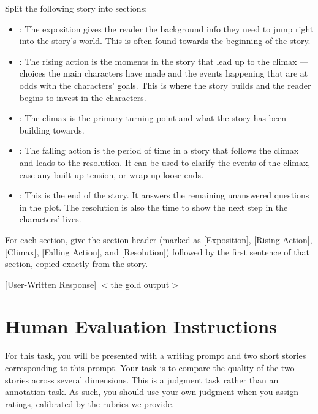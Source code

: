 \documentclass{article}
\begin{document}
\begin{tcolorbox}[colback=white, colframe=my-red, coltitle=black, parskip=5mm, title=
\textbf{\textsc{[Writing]} Synthetic Data Generation}, breakable, halign=flush left]
Split the following story into sections:
\begin{itemize}
\item[{$\star$}] [Exposition]: The exposition gives the reader the background info they need to jump right into the story's world. This is often found towards the beginning of the story.

\item[{$\star$}] [Rising Action]: The rising action is the moments in the story that lead up to the climax — choices the main characters have made and the events happening that are at odds with the characters' goals. This is where the story builds and the reader begins to invest in the characters.

\item[{$\star$}] [Climax]: The climax is the primary turning point and what the story has been building towards.

\item[{$\star$}] [Falling Action]: The falling action is the period of time in a story that follows the climax and leads to the resolution. It can be used to clarify the events of the climax, ease any built-up tension, or wrap up loose ends.

\item[{$\star$}] [Resolution]: This is the end of the story. It answers the remaining unanswered questions in the plot. The resolution is also the time to show the next step in the characters' lives.
\end{itemize}

For each section, give the section header (marked as [Exposition], [Rising Action], [Climax], [Falling Action], and [Resolution]) followed by the first sentence of that section, copied exactly from the story.
\bigskip

[User-Written Response]
$<$the gold output$>$
\end{tcolorbox}
\newpage

\section{Human Evaluation Instructions}
\label{appendix:instructions} 

For this task, you will be presented with a writing prompt and two  short stories corresponding to this prompt. Your task is to compare the quality of the two stories across several dimensions. This is a judgment task rather than an annotation task. As such, you should use your own judgment when you assign ratings, calibrated by the rubrics we provide.
\end{document}

